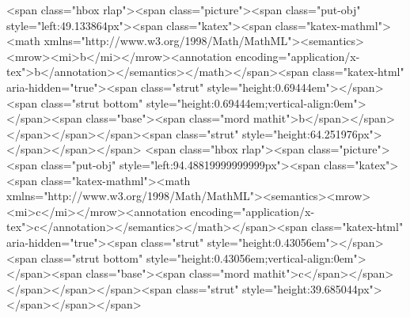 <span class="hbox rlap"><span class="picture"><span class="put-obj" style="left:49.133864px"><span class="katex"><span class="katex-mathml"><math xmlns="http://www.w3.org/1998/Math/MathML"><semantics><mrow><mi>b</mi></mrow><annotation encoding="application/x-tex">b</annotation></semantics></math></span><span class="katex-html" aria-hidden="true"><span class="strut" style="height:0.69444em"></span><span class="strut bottom" style="height:0.69444em;vertical-align:0em"></span><span class="base"><span class="mord mathit">b</span></span></span></span></span><span class="strut" style="height:64.251976px"></span></span></span>
<span class="hbox rlap"><span class="picture"><span class="put-obj" style="left:94.48819999999999px"><span class="katex"><span class="katex-mathml"><math xmlns="http://www.w3.org/1998/Math/MathML"><semantics><mrow><mi>c</mi></mrow><annotation encoding="application/x-tex">c</annotation></semantics></math></span><span class="katex-html" aria-hidden="true"><span class="strut" style="height:0.43056em"></span><span class="strut bottom" style="height:0.43056em;vertical-align:0em"></span><span class="base"><span class="mord mathit">c</span></span></span></span></span><span class="strut" style="height:39.685044px"></span></span></span>
